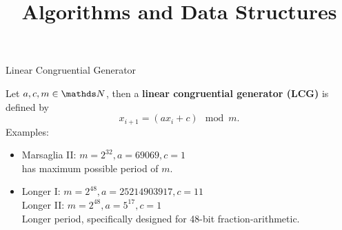 \documentclass[11pt,compress,t,notes=noshow, xcolor=table]{beamer}
\title{Algorithms and Data Structures}
\begin{document}

\begin{vbframe}{Linear Congruential Generator}

Let $a,c,m \in \N$, then a \textbf{linear congruential generator (LCG)} is defined by
$$
  x_{i+1} = (a x_i + c) \mod m.
$$
Examples:
\begin{itemize}
 \item Marsaglia II: $m = 2^{32}, a = 69069, c = 1$ \\
has maximum possible period of $m$.
\item Longer I: $m = 2^{48}, a = 25214903917, c = 11$ \\
Longer II: $m = 2^{48}, a = 5^{17}, c = 1$ \\
Longer period, specifically designed for 48-bit fraction-arithmetic.
\end{itemize}

%

\end{vbframe}
\end{document}

